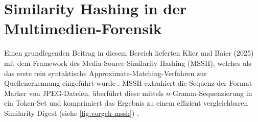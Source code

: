 \section{Similarity Hashing in der Multimedien-Forensik}
\label{sec:similarity_hashing_multimedia}

Einen grundlegenden Beitrag in diesem Bereich lieferten Klier und Baier (2025) mit dem Framework des Media Source Similarity Hashing (MSSH), welches als das erste rein syntaktische Approximate-Matching-Verfahren zur Quellenerkennung eingeführt wurde \cite[Kap. 1]{klier_media_2025}. MSSH extrahiert die Sequenz der Format-Marker von JPEG-Dateien, überführt diese mittels \(n\)-Gramm-Sequenzierung in ein Token-Set und komprimiert das Ergebnis zu einem effizient vergleichbaren Similarity Digest (siehe \cref{fig:vorgeh-mssh}) \cite[Kap. 3]{klier_media_2025}.

